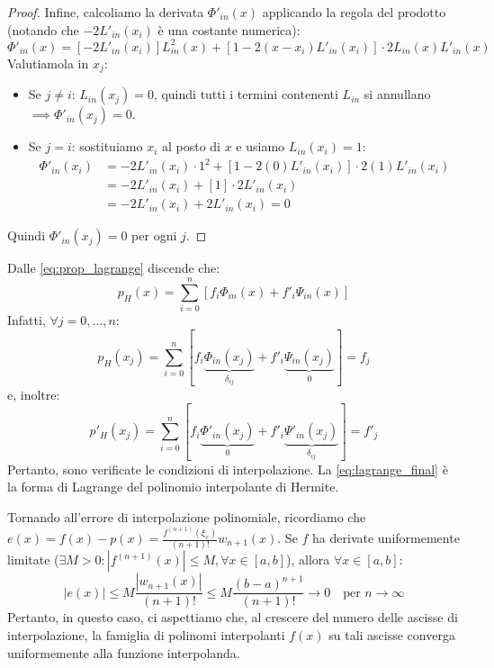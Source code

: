 \begin{proof}
    Infine, calcoliamo la derivata $\Phi'_{in}(x)$ applicando la regola del prodotto (notando che $-2L'_{in}(x_i)$ è una costante numerica):
    $$ \Phi'_{in}(x) = \left[ -2L'_{in}(x_i) \right] L_{in}^2(x) + [1 - 2(x - x_i)L'_{in}(x_i)] \cdot 2L_{in}(x)L'_{in}(x) $$
    Valutiamola in $x_j$:
    \begin{itemize}
        \item Se $j \neq i$: $L_{in}(x_j) = 0$, quindi tutti i termini contenenti $L_{in}$ si annullano $\implies \Phi'_{in}(x_j) = 0$.
        \item Se $j = i$: sostituiamo $x_i$ al posto di $x$ e usiamo $L_{in}(x_i) = 1$:
        \begin{align*}
            \Phi'_{in}(x_i) &= -2L'_{in}(x_i) \cdot 1^2 + [1 - 2(0)L'_{in}(x_i)] \cdot 2(1)L'_{in}(x_i) \\
            &= -2L'_{in}(x_i) + [1] \cdot 2L'_{in}(x_i) \\
            &= -2L'_{in}(x_i) + 2L'_{in}(x_i) = 0
        \end{align*}
    \end{itemize}
    Quindi $\Phi'_{in}(x_j) = 0$ per ogni $j$.
    \end{proof}

\vspace{0.4cm}
Dalle \eqref{eq:prop_lagrange} discende che:
\begin{equation} \label{eq:lagrange_final}
p_H(x) = \sum_{i=0}^{n} [f_i \Phi_{in}(x) + f'_i \Psi_{in}(x)]
\end{equation}
Infatti, $\forall j=0, \dots, n$:
$$ p_H(x_j) = \sum_{i=0}^{n} [f_i \underbrace{\Phi_{in}(x_j)}_{\delta_{ij}} + f'_i \underbrace{\Psi_{in}(x_j)}_{0}] = f_j $$
e, inoltre:
$$ p'_H(x_j) = \sum_{i=0}^{n} [f_i \underbrace{\Phi'_{in}(x_j)}_{0} + f'_i \underbrace{\Psi'_{in}(x_j)}_{\delta_{ij}}] = f'_j $$
Pertanto, sono verificate le condizioni di interpolazione. La \eqref{eq:lagrange_final} è la forma di Lagrange del polinomio interpolante di Hermite.









\vspace{1cm}

Tornando all'errore di interpolazione polinomiale, ricordiamo che $e(x) = f(x) - p(x) = \frac{f^{(n+1)}(\xi_x)}{(n+1)!} w_{n+1}(x)$.
Se $f$ ha derivate uniformemente limitate ($\exists M > 0 : |f^{(n+1)}(x)| \le M, \forall x \in [a,b]$), allora $\forall x \in [a,b]$:
$$|e(x)| \le M \frac{|w_{n+1}(x)|}{(n+1)!} \le M \frac{(b-a)^{n+1}}{(n+1)!} \to 0 \quad \text{per } n \to \infty$$
Pertanto, in questo caso, ci aspettiamo che, al crescere del numero delle ascisse di interpolazione, la famiglia di polinomi interpolanti $f(x)$ su tali ascisse converga uniformemente alla funzione interpolanda.

